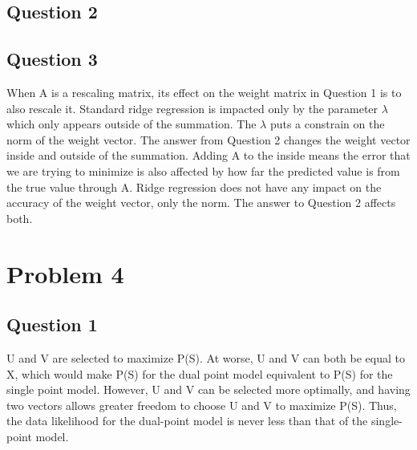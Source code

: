 \documentclass[12pt]{article} %
\begin{document}
\subsection{Question 2}
\begin{figure}[H]
	\vspace{-10mm}
\end{figure}

\subsection{Question 3}
When A is a rescaling matrix, its effect on the weight matrix in Question 1 is to also rescale it. Standard ridge regression is impacted only by the parameter $\lambda$ which only appears outside of the summation. The $\lambda$ puts  a constrain on the norm of the weight vector. The answer from Question 2 changes the weight vector inside and outside of the summation. Adding A to the inside means the error that we are trying to minimize is also affected by how far the predicted value is from the true value through A. Ridge regression does not have any impact on the accuracy of the weight vector, only the norm. The answer to Question 2 affects both.

\section{Problem 4}

\subsection{Question 1}
U and V are selected to maximize P(S). At worse, U and V can both be equal to X, which would make P(S) for the dual point model equivalent to P(S) for the single point model. However, U and V can be selected more optimally, and having two vectors allows greater freedom to choose U and V to maximize P(S). Thus, the data likelihood for the dual-point model is never less than that of the single-point model.
\end{document}
